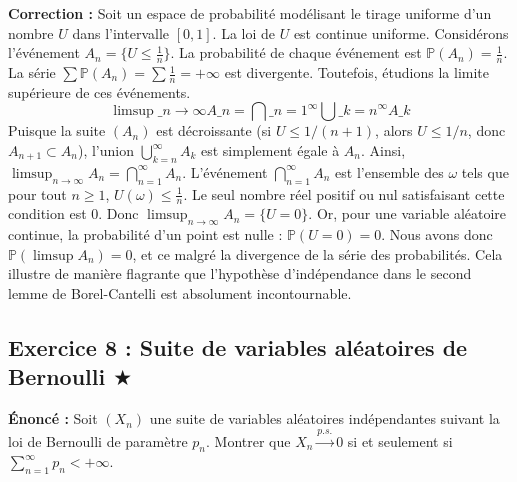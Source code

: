 \documentclass[11pt,a4paper]{article}
\begin{document}
\textbf{Correction :}
Soit un espace de probabilité modélisant le tirage uniforme d'un nombre $U$ dans l'intervalle $[0, 1]$. La loi de $U$ est continue uniforme.
Considérons l'événement $A_n = \{ U \le \frac{1}{n} \}$.
La probabilité de chaque événement est $\mathbb{P}(A_n) = \frac{1}{n}$.
La série $\sum \mathbb{P}(A_n) = \sum \frac{1}{n} = +\infty$ est divergente.
Toutefois, étudions la limite supérieure de ces événements.
$$ \limsup\_{n \to \infty} A\_n = \bigcap\_{n=1}^\infty \bigcup\_{k=n}^\infty A\_k $$
Puisque la suite $(A_n)$ est décroissante (si $U \le 1/(n+1)$, alors $U \le 1/n$, donc $A_{n+1} \subset A_n$), l'union $\bigcup_{k=n}^\infty A_k$ est simplement égale à $A_n$.
Ainsi, $\limsup_{n \to \infty} A_n = \bigcap_{n=1}^\infty A_n$.
L'événement $\bigcap_{n=1}^\infty A_n$ est l'ensemble des $\omega$ tels que pour tout $n \ge 1$, $U(\omega) \le \frac{1}{n}$.
Le seul nombre réel positif ou nul satisfaisant cette condition est $0$.
Donc $\limsup_{n \to \infty} A_n = \{ U = 0 \}$.
Or, pour une variable aléatoire continue, la probabilité d'un point est nulle : $\mathbb{P}(U = 0) = 0$.
Nous avons donc $\mathbb{P}(\limsup A_n) = 0$, et ce malgré la divergence de la série des probabilités.
Cela illustre de manière flagrante que l'hypothèse d'indépendance dans le second lemme de Borel-Cantelli est absolument incontournable.


\subsection*{Exercice 8 : Suite de variables aléatoires de Bernoulli \quad $\bigstar$}





\textbf{Énoncé :}
Soit $(X_n)$ une suite de variables aléatoires indépendantes suivant la loi de Bernoulli de paramètre $p_n$.
Montrer que $X_n \xrightarrow{p.s.} 0$ si et seulement si $\sum_{n=1}^\infty p_n < +\infty$.
\end{document}
